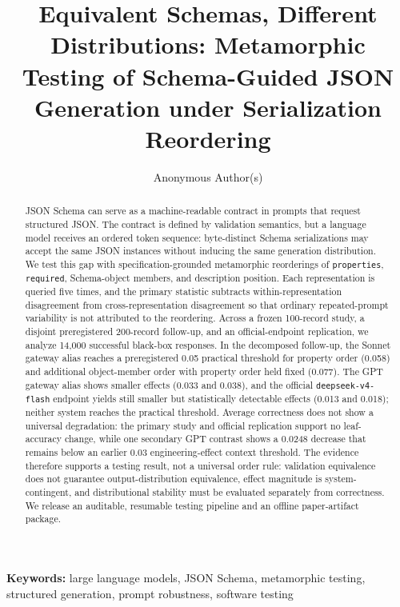 \documentclass[10pt]{article}
\title{Equivalent Schemas, Different Distributions: Metamorphic Testing of Schema-Guided JSON Generation under Serialization Reordering}
\author{\name Anonymous Author(s)}
\begin{document}
\maketitle
\begingroup\renewcommand\thefootnote{}\endgroup
\begin{abstract}
JSON Schema can serve as a machine-readable contract in prompts that request structured JSON. The contract is defined by validation semantics, but a language model receives an ordered token sequence: byte-distinct Schema serializations may accept the same JSON instances without inducing the same generation distribution. We test this gap with specification-grounded metamorphic reorderings of \texttt{properties}, \texttt{required}, Schema-object members, and description position. Each representation is queried five times, and the primary statistic subtracts within-representation disagreement from cross-representation disagreement so that ordinary repeated-prompt variability is not attributed to the reordering. Across a frozen 100-record study, a disjoint preregistered 200-record follow-up, and an official-endpoint replication, we analyze 14,000 successful black-box responses. In the decomposed follow-up, the Sonnet gateway alias reaches a preregistered 0.05 practical threshold for property order (0.058) and additional object-member order with property order held fixed (0.077). The GPT gateway alias shows smaller effects (0.033 and 0.038), and the official \texttt{deepseek-v4-flash} endpoint yields still smaller but statistically detectable effects (0.013 and 0.018); neither system reaches the practical threshold. Average correctness does not show a universal degradation: the primary study and official replication support no leaf-accuracy change, while one secondary GPT contrast shows a 0.0248 decrease that remains below an earlier 0.03 engineering-effect context threshold. The evidence therefore supports a testing result, not a universal order rule: validation equivalence does not guarantee output-distribution equivalence, effect magnitude is system-contingent, and distributional stability must be evaluated separately from correctness. We release an auditable, resumable testing pipeline and an offline paper-artifact package.
\end{abstract}
\noindent\textbf{Keywords:} large language models, JSON Schema, metamorphic testing, structured generation, prompt robustness, software testing
\end{document}
